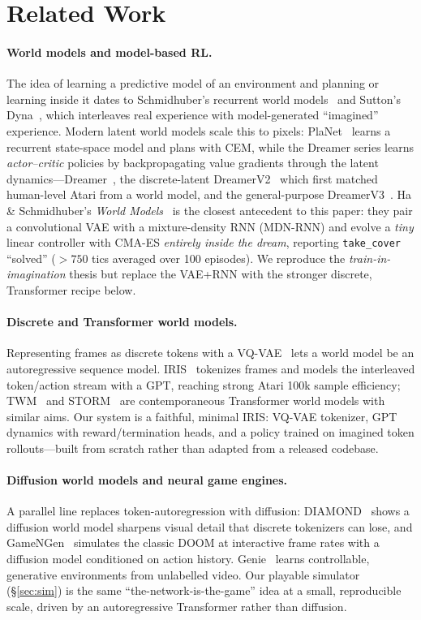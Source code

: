 \documentclass[11pt]{article}
\begin{document}
\section{Related Work}\label{sec:related}
\paragraph{World models and model-based RL.} The idea of learning a predictive model of an
environment and planning or learning inside it dates to Schmidhuber's recurrent world
models~\cite{schmidhuber1990} and Sutton's Dyna~\cite{sutton1991}, which interleaves real
experience with model-generated ``imagined'' experience. Modern latent world models scale this
to pixels: PlaNet~\cite{hafner2019} learns a recurrent state-space model and plans with CEM,
while the Dreamer series learns \emph{actor--critic} policies by backpropagating value gradients
through the latent dynamics---Dreamer~\cite{hafner2020}, the discrete-latent
DreamerV2~\cite{hafner2021} which first matched human-level Atari from a world model, and the
general-purpose DreamerV3~\cite{hafner2023}. Ha \& Schmidhuber's \emph{World
Models}~\cite{ha2018} is the closest antecedent to this paper: they pair a convolutional VAE with
a mixture-density RNN (MDN-RNN) and evolve a \emph{tiny} linear controller with CMA-ES
\emph{entirely inside the dream}, reporting \texttt{take\_cover} ``solved'' ($>750$ tics averaged
over 100 episodes). We reproduce the \emph{train-in-imagination} thesis but replace the VAE+RNN
with the stronger discrete, Transformer recipe below.

\paragraph{Discrete and Transformer world models.} Representing frames as discrete tokens with a
VQ-VAE~\cite{oord2017} lets a world model be an autoregressive sequence model. IRIS~\cite{micheli2023}
tokenizes frames and models the interleaved token/action stream with a GPT, reaching strong Atari
100k sample efficiency; TWM~\cite{robine2023} and STORM~\cite{zhang2023} are contemporaneous
Transformer world models with similar aims. Our system is a faithful, minimal IRIS: VQ-VAE
tokenizer, GPT dynamics with reward/termination heads, and a policy trained on imagined token
rollouts---built from scratch rather than adapted from a released codebase.

\paragraph{Diffusion world models and neural game engines.} A parallel line replaces
token-autoregression with diffusion: DIAMOND~\cite{alonso2024} shows a diffusion world model
sharpens visual detail that discrete tokenizers can lose, and GameNGen~\cite{valevski2024}
simulates the classic DOOM at interactive frame rates with a diffusion model conditioned on
action history. Genie~\cite{bruce2024} learns controllable, generative environments from unlabelled
video. Our playable simulator (\S\ref{sec:sim}) is the same ``the-network-is-the-game'' idea at a
small, reproducible scale, driven by an autoregressive Transformer rather than diffusion.
\end{document}
